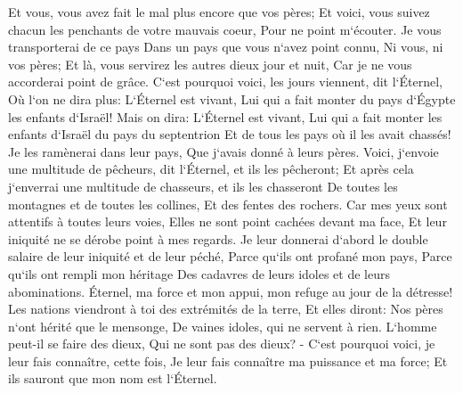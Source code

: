 \verse Et vous, vous avez fait le mal plus encore que vos pères; Et voici, vous suivez chacun les penchants de votre mauvais coeur, Pour ne point m`écouter. 
\verse Je vous transporterai de ce pays Dans un pays que vous n`avez point connu, Ni vous, ni vos pères; Et là, vous servirez les autres dieux jour et nuit, Car je ne vous accorderai point de grâce. 
\verse C`est pourquoi voici, les jours viennent, dit l`Éternel, Où l`on ne dira plus: L`Éternel est vivant, Lui qui a fait monter du pays d`Égypte les enfants d`Israël! 
\verse Mais on dira: L`Éternel est vivant, Lui qui a fait monter les enfants d`Israël du pays du septentrion Et de tous les pays où il les avait chassés! Je les ramènerai dans leur pays, Que j`avais donné à leurs pères. 
\verse Voici, j`envoie une multitude de pêcheurs, dit l`Éternel, et ils les pêcheront; Et après cela j`enverrai une multitude de chasseurs, et ils les chasseront De toutes les montagnes et de toutes les collines, Et des fentes des rochers. 
\verse Car mes yeux sont attentifs à toutes leurs voies, Elles ne sont point cachées devant ma face, Et leur iniquité ne se dérobe point à mes regards. 
\verse Je leur donnerai d`abord le double salaire de leur iniquité et de leur péché, Parce qu`ils ont profané mon pays, Parce qu`ils ont rempli mon héritage Des cadavres de leurs idoles et de leurs abominations. 
\verse Éternel, ma force et mon appui, mon refuge au jour de la détresse! Les nations viendront à toi des extrémités de la terre, Et elles diront: Nos pères n`ont hérité que le mensonge, De vaines idoles, qui ne servent à rien. 
\verse L`homme peut-il se faire des dieux, Qui ne sont pas des dieux? - 
\verse C`est pourquoi voici, je leur fais connaître, cette fois, Je leur fais connaître ma puissance et ma force; Et ils sauront que mon nom est l`Éternel. 

